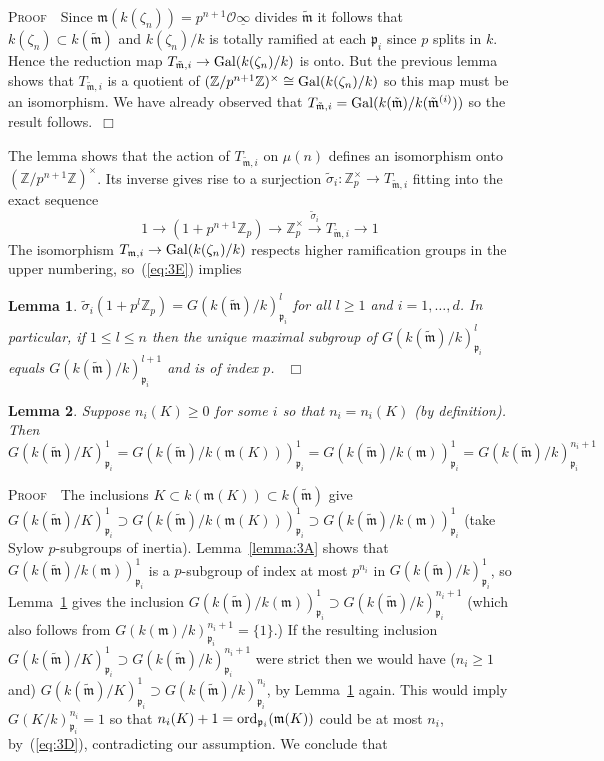\documentclass[12pt]{article}
\newtheorem{lemma}{Lemma}[section]
\newcounter{rem}[section]%
\newcommand{\bbZ}{\ensuremath{\mathbb{Z}}}
\newcommand{\beql}[1]{\begin{equation}\label{#1}}
\newcommand{\bPf}{\noindent \textsc{Proof\ }}
\newcommand{\cO}{\ensuremath{\mathcal{O}}}
\newcommand{\eeq}{\end{equation}}
\newcommand{\ePf}{\hspace*{\fill}~$\Box$\vertsp\par}%
\newcommand{\fm}{\ensuremath{\mathfrak{m}}}
\newcommand{\fp}{\ensuremath{\mathfrak{p}}}
\newcommand{\Gal}{{\rm Gal}}
\newcommand{\ord}{{\rm ord}}
\newcommand{\refeq}[1]{~(\ref{eq:#1})}
\newcommand{\rem}{\refstepcounter{rem}\noindent{\sc Remark \therem}}%
\renewcommand{\therem}{\thesection.\arabic{rem}}
\newcommand{\vertsp}{\vspace{1ex}}
\newcommand{\tfm}{\ensuremath{{\tilde{\fm}}}}
\newcommand{\tfmi}{\ensuremath{{\tfm^{(i)}}}}
\newcommand{\Ttmi}{\ensuremath{T_{\tfm,i}}}
\newcommand{\tsigma}{\ensuremath{\tilde{\sigma}}}
\newcommand{\uinf}{\ensuremath{{\underline{\infty}}}}
\begin{document}
\bPf\ Since $\fm(k(\zeta_n))=p^{n+1}\cO\uinf$ divides $\tfm$ it follows
that $k(\zeta_n)\subset k(\tfm)$ and
$k(\zeta_n)/k$ is totally ramified at each $\fp_i$ since $p$ splits in $k$.
Hence the reduction map $T_{\tfm,i}\rightarrow\Gal(k(\zeta_n)/k)$ is onto.
But the previous lemma shows that $T_{\tfm,i}$ is a quotient of
$(\bbZ/p^{n+1}\bbZ)^\times\cong\Gal(k(\zeta_n)/k)$ so this map must be an
isomorphism. We have already observed that $T_{\tfm,i}=\Gal(k(\tfm)/k(\tfmi))$
so the result follows.\ePf
\noindent The lemma shows that the action of $\Ttmi$ on $\mu(n)$ defines an
isomorphism onto $(\bbZ/p^{n+1}\bbZ)^\times$. Its inverse gives rise to a surjection
$\tsigma_i:\bbZ_p^\times\rightarrow T_{\tfm,i}$ fitting into the exact sequence
\[
1\rightarrow (1+p^{n+1}\bbZ_p)\longrightarrow \bbZ_p^\times
\stackrel{\tsigma_i}{\longrightarrow}
\Ttmi\rightarrow 1
\]
The isomorphism $T_{\fm,i}\rightarrow\Gal(k(\zeta_n)/k)$ respects higher
ramification groups in the upper numbering,
so\refeq{3E} implies
\begin{lemma}\label{lemma:3B}
$\tsigma_i(1+p^l\bbZ_p)=G(k(\tfm)/k)^l_{\fp_i}$ for all $l\geq 1$ and $i=1,\ldots,d$.
In particular, if $1\leq l\leq n$ then the unique maximal subgroup of
$G(k(\tfm)/k)^l_{\fp_i}$ equals $G(k(\tfm)/k)^{l+1}_{\fp_i}$ and is of index $p$.
\ePf
\end{lemma}
\begin{lemma}\label{lemma:3C}
Suppose $n_i(K)\geq 0$ for some $i$ so that $n_i=n_i(K)$ (by definition). Then
\beql{eq:3F}
G(k(\tfm)/K)^1_{\fp_i}=G(k(\tfm)/k(\fm(K)))^1_{\fp_i}=G(k(\tfm)/k(\fm))^1_{\fp_i}=
G(k(\tfm)/k)^{n_i+1}_{\fp_i}
\eeq
\end{lemma}
\bPf\ The inclusions $K\subset k(\fm(K))\subset k(\tfm)$ give
$G(k(\tfm)/K)^1_{\fp_i}\supset G(k(\tfm)/k(\fm(K)))^1_{\fp_i}\supset
G(k(\tfm)/k(\fm))^1_{\fp_i}$ (take Sylow $p$-subgroups of inertia).
Lemma~\ref{lemma:3A} shows that $G(k(\tfm)/k(\fm))^1_{\fp_i}$ is a
$p$-subgroup of index at most $p^{n_i}$ in $G(k(\tfm)/k)^{1}_{\fp_i}$,
so Lemma~\ref{lemma:3B} gives the inclusion
$G(k(\tfm)/k(\fm))^1_{\fp_i}\supset G(k(\tfm)/k)^{n_i+1}_{\fp_i}$ (which also follows from
$G(k(\fm)/k)^{n_i+1}_{\fp_i}=\{1\}$.) If the resulting inclusion
$G(k(\tfm)/K)^1_{\fp_i}\supset G(k(\tfm)/k)^{n_i+1}_{\fp_i}$ were strict then
we would have ($n_i\geq 1$ and)
$G(k(\tfm)/K)^1_{\fp_i}\supset G(k(\tfm)/k)^{n_i}_{\fp_i}$, by Lemma~\ref{lemma:3B} again.
This would imply $G(K/k)^{n_i}_{\fp_i}=1$ so that
$n_i(K)+1=\ord_{\fp_i}(\fm(K))$ could be at most $n_i$,
by\refeq{3D}, contradicting our assumption. We conclude that
\end{document}
